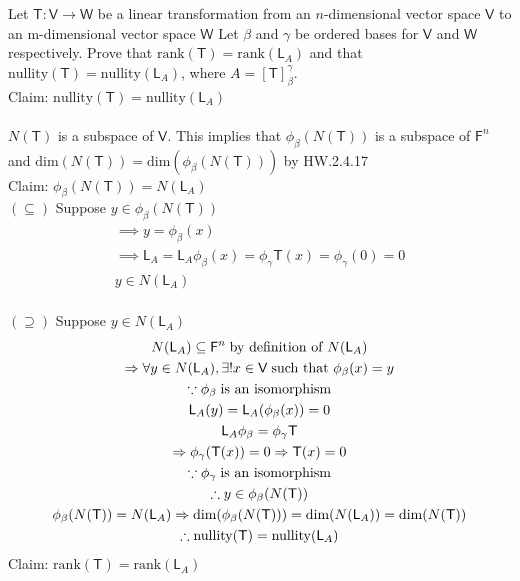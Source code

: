 Let $\mathsf{T}\colon\mathsf{V}\to\mathsf{W}$ be a linear
transformation from an $n$-dimensional vector space $\mathsf{V}$ to an
m-dimensional vector space $\mathsf{W}$  Let $\beta$ and $\gamma$ be
ordered bases for $\mathsf{V}$ and $\mathsf{W}$ respectively. Prove
that $\text{rank}(\mathsf{T}) = \text{rank}(\mathsf{L}_A)$ and that
$\text{nullity}(\mathsf{T}) = \text{nullity}(\mathsf{L}_A)$, where $A = [\mathsf{T}]^\gamma_\beta$.
\\Claim: $\text{nullity}(\mathsf{T}) = \text{nullity}(\mathsf{L}_A)$
\paragraph{}$N(\mathsf{T})$ is a subspace of $\mathsf{V}$. This implies
that $\phi_\beta(N(\mathsf{T}))$ is a subspace of $\mathsf{F}^n$ and
$\text{dim}(N(\mathsf{T})) = \text{dim}(\phi_\beta(N(\mathsf{T})))$ by HW.2.4.17
\\Claim: $\phi_\beta(N(\mathsf{T})) = N(\mathsf{L}_A)$
\\$(\subseteq)$ Suppose $y \in \phi_\beta(N(\mathsf{T}))$
\begin{gather}
\implies y = \phi_\beta(x)\\
\implies \mathsf{L}_A = \mathsf{L}_A\phi_\beta(x) =
\phi_\gamma\mathsf{T}(x) = \phi_\gamma(0) =0 \\
y \in N(\mathsf{L}_A)
\end{gather}
\\$(\supseteq)$ Suppose $y \in N(\mathsf{L}_A)$
\begin{gather}
N(\mathsf{L}_A) \subseteq \mathsf{F}^n\;\text{by definition of }
N(\mathsf{L}_A)\\
\implies \forall y \in N(\mathsf{L}_A), \exists ! x\in \mathsf{V}
\;\text{such that } \phi_\beta(x) = y\\
\notag \because \phi_\beta\; \text{is an isomorphism}\\
\mathsf{L}_A(y) = \mathsf{L}_A(\phi_\beta(x)) =0 \\
\mathsf{L}_A\phi_\beta = \phi_\gamma\mathsf{T}\\
\implies \phi_\gamma(\mathsf{T}(x)) = 0
\implies \mathsf{T}(x) =0 \\
\notag \because \phi_\gamma\; \text{is an isomorphism}\\
\therefore y \in \phi_\beta(N(\mathsf{T}))\\
\phi_\beta(N(\mathsf{T})) = N(\mathsf{L}_A) \implies \text{dim}(\phi_\beta(N(\mathsf{T}))) = \text{dim}(N(\mathsf{L}_A))=\text{dim}(N(\mathsf{T}))\\
\therefore \text{nullity}(\mathsf{T}) = \text{nullity}(\mathsf{L}_A)
\end{gather}
\newpage{}
Claim: $\text{rank}(\mathsf{T}) = \text{rank}(\mathsf{L}_A)$
